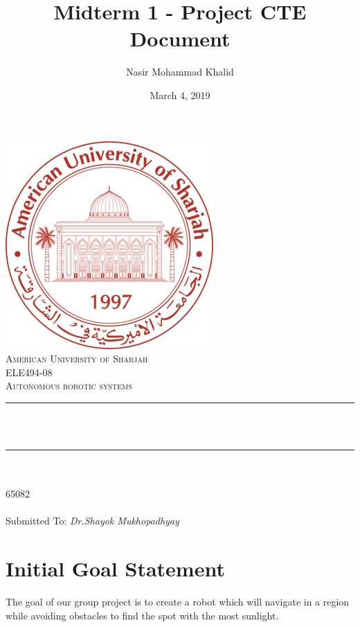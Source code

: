 \documentclass[a4paper, 12pt]{article}
\title{Midterm 1 - Project CTE Document}
\author{Nasir Mohammad Khalid}
\date{March 4, 2019}
\makeatletter
\let\thetitle\@title
\let\theauthor\@author
\let\thedate\@date
\makeatother
\begin{document}
 
    \begin{titlepage}
        \centering
        \vspace*{0.5 cm}
        \includegraphics[scale = 0.60]{logo.png}\\[1.0 cm]	%
        \textsc{\LARGE American University of Sharjah}\\[1.0 cm]
        \textsc{\Large ELE494-08}\\[0.2 cm]	
        \textsc{\Large Autonomous robotic systems}\\[0.5 cm]			%
        \rule{\linewidth}{0.2 mm} \\[0.4 cm]
        { \huge \bfseries \thetitle}\\
        \rule{\linewidth}{0.2 mm} \\[1.5 cm]
        
        \textsc{\Large{\theauthor}}\\[0.3 cm]
        \textsc{\Large{65082}}\\[0.3 cm]
        \textsc{\Large{\thedate}}\\[1.5 cm]

        \textmd{Submitted To: \itshape{Dr.Shayok Mukhopadhyay}}
    \end{titlepage}

    \clearpage
    \tableofcontents
    \listoffigures
    \listoftables
    \clearpage

    \section{Initial Goal Statement}

    The goal of our group project is to create a robot which will navigate in a region while avoiding obstacles to find the spot with the most sunlight.
\end{document}

